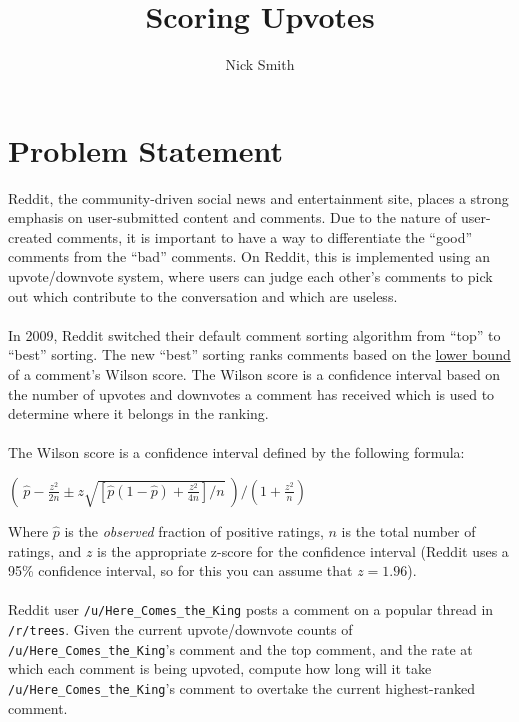 \documentclass[11pt]{article}
\title{\textbf{Scoring Upvotes}}
\author{Nick Smith}
\date{}
\begin{document}
\maketitle

\section{Problem Statement}
Reddit, the community-driven social news and entertainment site, places a
strong emphasis on user-submitted content and comments. Due to the nature
of user-created comments, it is important to have a way to differentiate
the ``good'' comments from the ``bad'' comments. On Reddit, this is
implemented using an upvote/downvote system, where users can judge each
other's comments to pick out which contribute to the conversation and
which are useless.
\\\\
In 2009, Reddit switched their default comment sorting algorithm from ``top''
to ``best'' sorting. The new ``best'' sorting ranks comments based on the \underline{lower bound}
of a comment's Wilson score. The Wilson score is a confidence interval
based on the number of upvotes and downvotes a comment has received which is
used to determine where it belongs in the ranking.
\\\\
The Wilson score is a confidence interval defined by the following formula:
\begin{center}
\fontsize{16pt}{16pt}
$\left(\ \hat{p} - \frac{z^2}{2n} \pm z\sqrt{\left[\hat{p}(1 - \hat{p}) + \frac{z^2}{4n}\right]/n}\ \right)/(1 + \frac{z^2}{n})$
\end{center}
Where $\hat{p}$ is the \emph{observed} fraction of positive ratings, $n$ is
the total number of ratings, and $z$ is the appropriate z-score for the
confidence interval (Reddit uses a 95\% confidence interval, so for this you
can assume that $z = 1.96$).
\\\\
Reddit user \texttt{/u/Here\_Comes\_the\_King} posts a comment on a popular
thread in \texttt{/r/trees}. Given the current upvote/downvote counts of
\texttt{/u/Here\_Comes\_the\_King}'s comment and the top comment, and the
rate at which each comment is being upvoted,
compute how long will it take \texttt{/u/Here\_Comes\_the\_King}'s comment
to overtake the current highest-ranked comment.
\end{document}
